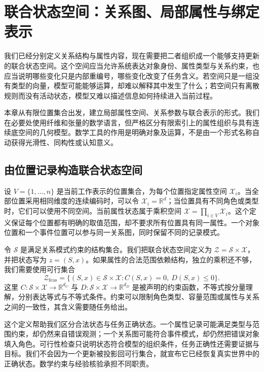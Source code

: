 \chapter{联合状态空间：关系图、局部属性与绑定表示}
\label{chp:universe_geometry}

我们已经分别定义关系结构与属性内容，现在需要把二者组织成一个能够支持更新的联合状态空间。这个空间应当允许系统表达对象身份、属性类型与关系约束，也应当说明哪些变化只是内部重编号，哪些变化改变了任务含义。若空间只是一组没有类型的向量，模型可能能够运算，却难以解释其中发生了什么；若空间只有离散规则而没有活动状态，模型又难以描述信息如何持续进入当前过程。

本章从有限位置集合出发，建立局部属性空间、关系参数与联合表示的形式。我们在必要处使用纤维和张量的数学语言，但严格区分有限索引上的属性组织与具有连续底空间的几何模型。数学工具的作用是明确对象及运算，不是由一个形式名称自动获得光滑性、同构性或认知意义。

\section{由位置记录构造联合状态空间}
\label{sec:topology_anatomy}

设 $V=\{1,\ldots,n\}$ 是当前工作表示的位置集合，为每个位置指定属性空间 $\mathcal X_i$。当全部位置采用相同维度的连续编码时，可以令 $\mathcal X_i=\mathbb R^d$；当位置具有不同角色或类型时，它们可以使用不同空间。当前属性状态属于乘积空间 $\mathcal X=\prod_{i\in V}\mathcal X_i$。这个定义保证每个位置都有明确的取值范围，却不要求所有位置具有同一属性。一个对象位置和一个事件位置可以参与同一关系图，同时保留不同的记录模式。

令 $\mathcal S$ 是满足关系模式约束的结构集合。我们把联合状态空间定义为 $\mathcal Z=\mathcal S\times\mathcal X$，并把状态写为 $z=(S,x)$。如果属性的合法范围依赖结构，独立的乘积还不够，我们需要使用可行集合
\begin{equation}
 \mathcal Z_{\mathrm{feas}}
 =\{(S,x)\in\mathcal S\times\mathcal X:C(S,x)=0,\ D(S,x)\leq0\}.
\end{equation}
这里 $C:\mathcal S\times\mathcal X\to\mathbb R^{d_C}$ 与 $D:\mathcal S\times\mathcal X\to\mathbb R^{d_D}$ 是被声明的约束函数，不等式按分量理解，分别表达等式与不等式条件。约束可以限制角色类型、容量范围或属性与关系之间的一致性，其含义需要随任务给出。

这个定义帮助我们区分合法状态与任务正确状态。一个属性记录可能满足类型与范围约束，却仍然来自错误观测；一个关系图可能符合事件模式，却仍然把错误对象填入角色。可行性检查只说明状态符合模型的组织条件，任务正确性还需要证据与目标。我们不会因为一个更新被投影回可行集合，就宣布它已经恢复真实世界中的正确状态。数学约束与经验核验承担不同职责。

